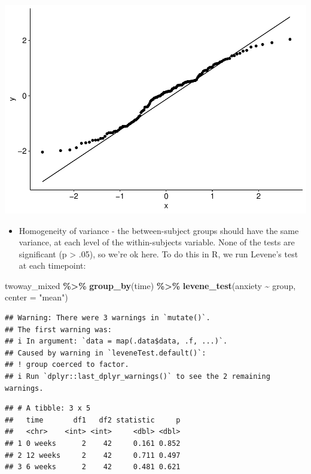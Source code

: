 \documentclass[
]{book}
\newenvironment{Shaded}{\begin{snugshade}}{\end{snugshade}}
\newcommand{\AttributeTok}[1]{\textcolor[rgb]{0.13,0.29,0.53}{#1}}
\newcommand{\FunctionTok}[1]{\textcolor[rgb]{0.13,0.29,0.53}{\textbf{#1}}}
\newcommand{\NormalTok}[1]{#1}
\newcommand{\SpecialCharTok}[1]{\textcolor[rgb]{0.81,0.36,0.00}{\textbf{#1}}}
\newcommand{\StringTok}[1]{\textcolor[rgb]{0.31,0.60,0.02}{#1}}
\providecommand{\tightlist}{%
  \setlength{\itemsep}{0pt}\setlength{\parskip}{0pt}}
\begin{document}
\includegraphics{_main_files/figure-latex/unnamed-chunk-260-1.pdf}

\begin{itemize}
\tightlist
\item
  Homogeneity of variance - the between-subject groups should have the same variance, at each level of the within-subjects variable. None of the tests are significant (p \textgreater{} .05), so we're ok here. To do this in R, we run Levene's test at each timepoint:
\end{itemize}

\begin{Shaded}
\begin{Highlighting}[]
\NormalTok{twoway\_mixed }\SpecialCharTok{\%\textgreater{}\%}
  \FunctionTok{group\_by}\NormalTok{(time) }\SpecialCharTok{\%\textgreater{}\%}
  \FunctionTok{levene\_test}\NormalTok{(anxiety }\SpecialCharTok{\textasciitilde{}}\NormalTok{ group, }\AttributeTok{center =} \StringTok{"mean"}\NormalTok{)}
\end{Highlighting}
\end{Shaded}

\begin{verbatim}
## Warning: There were 3 warnings in `mutate()`.
## The first warning was:
## i In argument: `data = map(.data$data, .f, ...)`.
## Caused by warning in `leveneTest.default()`:
## ! group coerced to factor.
## i Run `dplyr::last_dplyr_warnings()` to see the 2 remaining warnings.
\end{verbatim}

\begin{verbatim}
## # A tibble: 3 x 5
##   time       df1   df2 statistic     p
##   <chr>    <int> <int>     <dbl> <dbl>
## 1 0 weeks      2    42     0.161 0.852
## 2 12 weeks     2    42     0.711 0.497
## 3 6 weeks      2    42     0.481 0.621
\end{verbatim}
\end{document}

